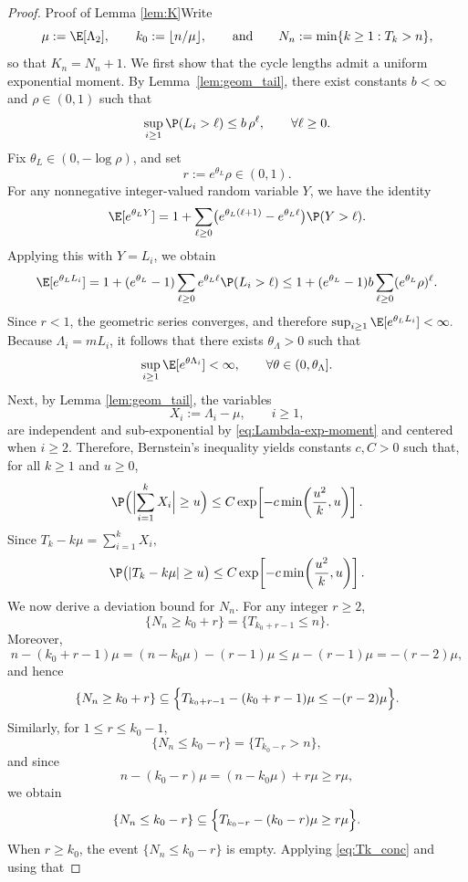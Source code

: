 \documentclass[mnsc,nonblindrev]{informs3}
\begin{document}
\begin{proof}{Proof of Lemma \ref{lem:K}}Write
\[
\mu:=\E[\Lambda_2],\qquad
k_0:=\lfloor n/\mu\rfloor,
\qquad\text{and}\qquad
N_n:=\min\{k\ge1:T_k>n\},
\]
so that $K_n=N_n+1.$ We first show that the cycle lengths admit a uniform exponential moment.
By Lemma~\ref{lem:geom_tail}, there exist constants \(b<\infty\) and
\(\rho\in(0,1)\) such that
\[
\sup_{i\ge1}\P(L_i>\ell)\le b\,\rho^\ell,
\qquad \forall \ell\ge0.
\]
Fix \(\theta_L\in(0,-\log\rho)\), and set
\[
r:=e^{\theta_L}\rho\in(0,1).
\]
For any nonnegative integer-valued random variable \(Y\), we have the identity
\[
\E[e^{\theta_L Y}]
=
1+\sum_{\ell\ge0}\bigl(e^{\theta_L(\ell+1)}-e^{\theta_L\ell}\bigr)\P(Y>\ell).
\]
Applying this with \(Y=L_i\), we obtain
\[
\E[e^{\theta_L L_i}]
=
1+(e^{\theta_L}-1)\sum_{\ell\ge0}e^{\theta_L\ell}\P(L_i>\ell)
\le
1+(e^{\theta_L}-1)b\sum_{\ell\ge0}(e^{\theta_L}\rho)^\ell.
\]
Since \(r<1\), the geometric series converges, and therefore $\sup_{i\ge1}\E[e^{\theta_L L_i}]<\infty.$ Because \(\Lambda_i=mL_i\), it follows that there exists
\(\theta_\Lambda>0\) such that
\begin{equation}\label{eq:Lambda-exp-moment}
\sup_{i\ge1}\E[e^{\theta \Lambda_i}]<\infty,
\qquad \forall \theta\in(0,\theta_\Lambda].
\end{equation}
Next, by Lemma \ref{lem:geom_tail}, the variables \[ X_i:=\Lambda_i-\mu,\qquad i\ge 1, \] are independent and sub-exponential by \eqref{eq:Lambda-exp-moment} and centered when $i \geq 2$. Therefore, Bernstein's inequality yields constants \(c,C>0\) such that, for all \(k\ge 1\) and \(u\ge0\), \[ \P\Bigl(\Bigl|\sum_{i=1}^{k}X_i\Bigr|\ge u\Bigr) \le C\exp\!\left[-c\min\!\left(\frac{u^2}{k},u\right)\right]. \] Since $T_k-k\mu = \sum_{i=1}^{k}X_i,$ \begin{equation}\label{eq:Tk_conc} \P\bigl(|T_k-k\mu|\ge u\bigr) \le C\exp\!\left[-c\min\!\left(\frac{u^2}{k},u\right)\right]. \end{equation}
We now derive a deviation bound for \(N_n\). For any integer \(r\ge2\),
\[
\{N_n\ge k_0+r\}=\{T_{k_0+r-1}\le n\}.
\]
Moreover,
\[
n-(k_0+r-1)\mu
=
(n-k_0\mu)-(r-1)\mu
\le
\mu-(r-1)\mu
=
-(r-2)\mu,
\]
and hence
\[
\{N_n\ge k_0+r\}
\subseteq
\Bigl\{
T_{k_0+r-1}-(k_0+r-1)\mu\le -(r-2)\mu
\Bigr\}.
\]
Similarly, for \(1\le r\le k_0-1\),
\[
\{N_n\le k_0-r\}=\{T_{k_0-r}>n\},
\]
and since
\[
n-(k_0-r)\mu=(n-k_0\mu)+r\mu\ge r\mu,
\]
we obtain
\[
\{N_n\le k_0-r\}
\subseteq
\Bigl\{
T_{k_0-r}-(k_0-r)\mu\ge r\mu
\Bigr\}.
\]
When \(r\ge k_0\), the event \(\{N_n\le k_0-r\}\) is empty. Applying \eqref{eq:Tk_conc} and using that

\end{proof}
\end{document}
